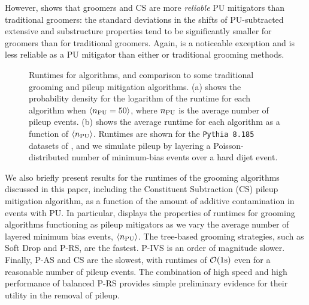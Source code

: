 \documentclass[letterpaper,11pt]{article}
\begin{document}
However,  shows that \PIRANHA{} groomers and CS are more \textit{reliable} PU mitigators than traditional groomers:
%
the standard deviations in the shifts of PU-subtracted extensive and substructure properties tend to be significantly smaller for \PIRANHA{} groomers than for traditional groomers.
%
Again,  is a noticeable exception and is less reliable as a PU mitigator than either \PIRANHA{} or traditional grooming methods.


\begin{figure}[t!]
    \caption{
    Runtimes for \PIRANHA{} algorithms, and comparison to some traditional grooming and pileup mitigation algorithms.
    (a) shows the probability density for the logarithm of the runtime for each algorithm when \(\langle n_{\rm PU} = 50\rangle\), where \(n_{\rm PU}\) is the average number of pileup events.
    (b) shows the average runtime for each algorithm as a function of \(\langle n_{\rm PU} \rangle\).
    Runtimes are shown for the \texttt{Pythia 8.185} datasets of , and we simulate pileup by layering a Poisson-distributed number of minimum-bias events over a hard dijet event.
    }
    \label{fig:runtimes}
\end{figure}


We also briefly present results for the runtimes of the grooming algorithms discussed in this paper, including the Constituent Subtraction (CS) pileup mitigation algorithm, as a function of the amount of additive contamination in events with PU.
%
In particular,  displays the properties of runtimes for grooming algorithms functioning as pileup mitigators as we vary the average number of layered minimum bias events, \(\langle n_{\rm PU} \rangle\).
%
The tree-based grooming strategies, such as Soft Drop and P-RS, are the fastest.
%
P-IVS is an order of magnitude slower.
%
Finally, P-AS and CS are the slowest, with runtimes of \(\mathcal O({\rm 1s})\) even for a reasonable number of pileup events.
%
The combination of high speed and high performance of balanced P-RS provides simple preliminary evidence for their utility in the removal of pileup.
\\~\\
\end{document}
